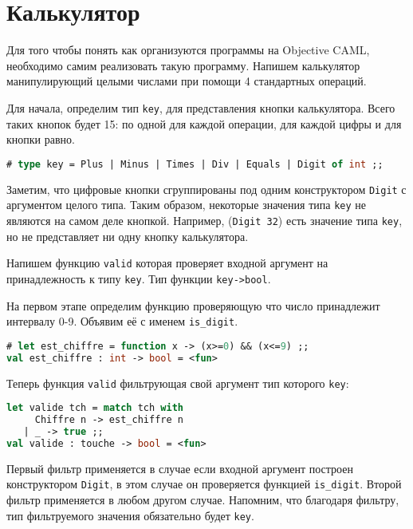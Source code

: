 \section{Калькулятор}

Для того чтобы понять как организуются программы на Objective CAML, необходимо
самим реализовать такую программу. Напишем калькулятор манипулирующий целыми
числами при помощи 4 стандартных операций.

Для начала, определим тип \texttt{key}, для представления кнопки калькулятора.
Всего таких кнопок будет 15: по одной для каждой операции, для каждой цифры и
для кнопки равно.

\begin{lstlisting}[language=OCaml]
# type key = Plus | Minus | Times | Div | Equals | Digit of int ;;
\end{lstlisting}

Заметим, что цифровые кнопки сгруппированы под одним конструктором
\texttt{Digit} с аргументом целого типа. Таким образом, некоторые значения типа
\texttt{key} не являются на самом деле кнопкой. Например, (\texttt{Digit 32})
есть значение типа \texttt{key}, но не представляет ни одну кнопку калькулятора.

Напишем функцию \texttt{valid} которая проверяет входной аргумент на
принадлежность к типу \texttt{key}. Тип функции \texttt{key->bool}.

На первом этапе определим функцию проверяющую что число принадлежит интервалу
0-9. Объявим её с именем \texttt{is\_digit}.

\begin{lstlisting}[language=OCaml]
# let est_chiffre = function x -> (x>=0) && (x<=9) ;;
val est_chiffre : int -> bool = <fun>
\end{lstlisting}

Теперь функция \texttt{valid} фильтрующая свой аргумент тип которого
\texttt{key}:

\begin{lstlisting}[language=OCaml]
let valide tch = match tch with
     Chiffre n -> est_chiffre n
   | _ -> true ;;
val valide : touche -> bool = <fun>
\end{lstlisting}

Первый фильтр применяется в случае если входной аргумент построен конструктором
\texttt{Digit}, в этом случае он проверяется функцией \texttt{is\_digit}. Второй
фильтр применяется в любом другом случае. Напомним, что благодаря фильтру, тип
фильтруемого значения обязательно будет \texttt{key}.

